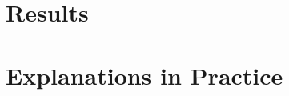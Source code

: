 \section{Results}
\label{sec:fi-results}

\section{Explanations in Practice}
\label{sec:fi-explanations}
\label{sec:fi-route1}   %
